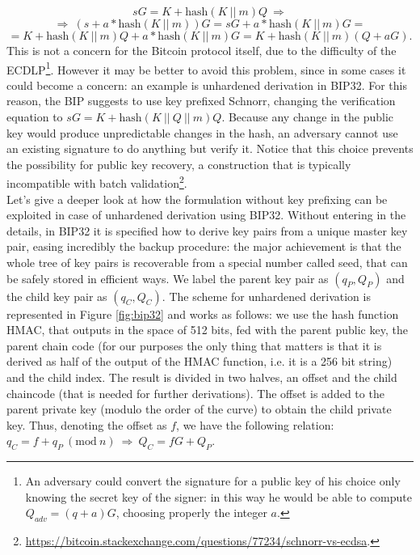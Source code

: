 $$sG = K + \text{hash}(K \ || \ m)Q \ \Longrightarrow$$
$$\Longrightarrow \ (s + a*\text{hash}(K \ || \ m))G = sG + a*\text{hash}(K \ || \ m)G =$$
$$= K + \text{hash}(K \ || \ m)Q + a*\text{hash}(K \ || \ m)G = K + \text{hash}(K \ || \ m)(Q + aG).$$
This is not a concern for the Bitcoin protocol itself, due to the difficulty of the ECDLP\footnote{An adversary could convert the signature for a public key of his choice only knowing the secret key of the signer: in this way he would be able to compute $Q_{adv} = (q + a)G$, choosing properly the integer $a$.}. However it may be better to avoid this problem, since in some cases it could become a concern: an example is unhardened derivation in BIP32. For this reason, the BIP suggests to use key prefixed Schnorr, changing the verification equation to $sG = K + \text{hash}(K \ || \ Q \ || \ m)Q$. Because any change in the public key would produce unpredictable changes in the hash, an adversary cannot use an existing signature to do anything but verify it. Notice that this choice prevents the possibility for public key recovery, a construction that is typically incompatible with batch validation\footnote{\url{https://bitcoin.stackexchange.com/questions/77234/schnorr-vs-ecdsa}.}.
\\
Let's give a deeper look at how the formulation without key prefixing can be exploited in case of unhardened derivation using BIP32. Without entering in the details, in BIP32 it is specified how to derive key pairs from a unique master key pair, easing incredibly the backup procedure: the major achievement is that the whole tree of key pairs is recoverable from a special number called seed, that can be safely stored in efficient ways. We label the parent key pair as $(q_P, Q_P)$ and the child key pair as $(q_C, Q_C)$. The scheme for unhardened derivation is represented in Figure \ref{fig:bip32} and works as follows: we use the hash function HMAC, that outputs in the space of 512 bits, fed with the parent public key, the parent chain code (for our purposes the only thing that matters is that it is derived as half of the output of the HMAC function, i.e. it is a 256 bit string) and the child index. The result is divided in two halves, an offset and the child chaincode (that is needed for further derivations). The offset is added to the parent private key (modulo the order of the curve) to obtain the child private key. Thus, denoting the offset as $f$, we have the following relation: $q_C = f + q_P \ (\text{mod} \ n) \ \Longrightarrow \ Q_C = fG + Q_P$.

